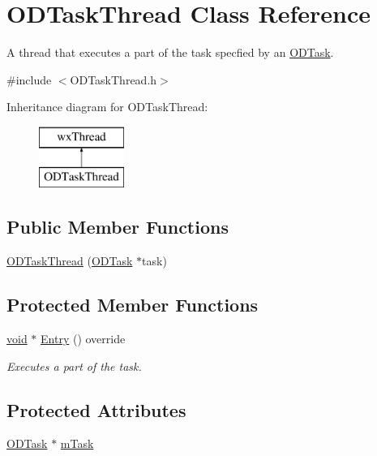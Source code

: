 \hypertarget{class_o_d_task_thread}{}\section{O\+D\+Task\+Thread Class Reference}
\label{class_o_d_task_thread}


A thread that executes a part of the task specfied by an \hyperlink{class_o_d_task}{O\+D\+Task}.  




{\ttfamily \#include $<$O\+D\+Task\+Thread.\+h$>$}

Inheritance diagram for O\+D\+Task\+Thread\+:\begin{figure}[H]
\begin{center}
\leavevmode
\includegraphics[height=2.000000cm]{class_o_d_task_thread}
\end{center}
\end{figure}
\subsection*{Public Member Functions}
\begin{DoxyCompactItemize}
\item 
\hyperlink{class_o_d_task_thread_a929b3cf07a263ddbd20dcc4b2b21ab41}{O\+D\+Task\+Thread} (\hyperlink{class_o_d_task}{O\+D\+Task} $\ast$task)
\end{DoxyCompactItemize}
\subsection*{Protected Member Functions}
\begin{DoxyCompactItemize}
\item 
\hyperlink{sound_8c_ae35f5844602719cf66324f4de2a658b3}{void} $\ast$ \hyperlink{class_o_d_task_thread_a743517f29df90723605f197938f1a61e}{Entry} () override
\begin{DoxyCompactList}\small\item\em Executes a part of the task. \end{DoxyCompactList}\end{DoxyCompactItemize}
\subsection*{Protected Attributes}
\begin{DoxyCompactItemize}
\item 
\hyperlink{class_o_d_task}{O\+D\+Task} $\ast$ \hyperlink{class_o_d_task_thread_af9a2155158a622c318012731e9d17ec9}{m\+Task}
\end{DoxyCompactItemize}


